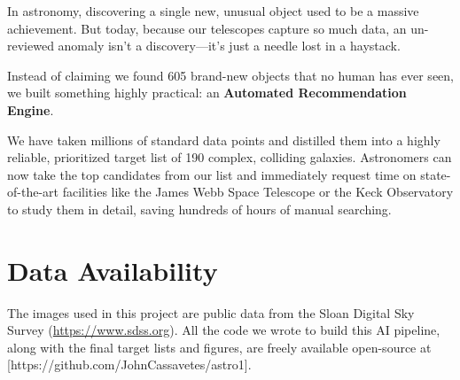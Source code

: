 \documentclass[twocolumn]{aastex631}
\begin{document}
In astronomy, discovering a single new, unusual object used to be a massive achievement. But today, because our telescopes capture so much data, an un-reviewed anomaly isn't a discovery—it's just a needle lost in a haystack. 

Instead of claiming we found 605 brand-new objects that no human has ever seen, we built something highly practical: an \textbf{Automated Recommendation Engine}. 

We have taken millions of standard data points and distilled them into a highly reliable, prioritized target list of 190 complex, colliding galaxies. Astronomers can now take the top candidates from our list and immediately request time on state-of-the-art facilities like the James Webb Space Telescope or the Keck Observatory to study them in detail, saving hundreds of hours of manual searching.

\section*{Data Availability}
The images used in this project are public data from the Sloan Digital Sky Survey (\url{https://www.sdss.org}). All the code we wrote to build this AI pipeline, along with the final target lists and figures, are freely available open-source at [https://github.com/JohnCassavetes/astro1].



\end{document}
